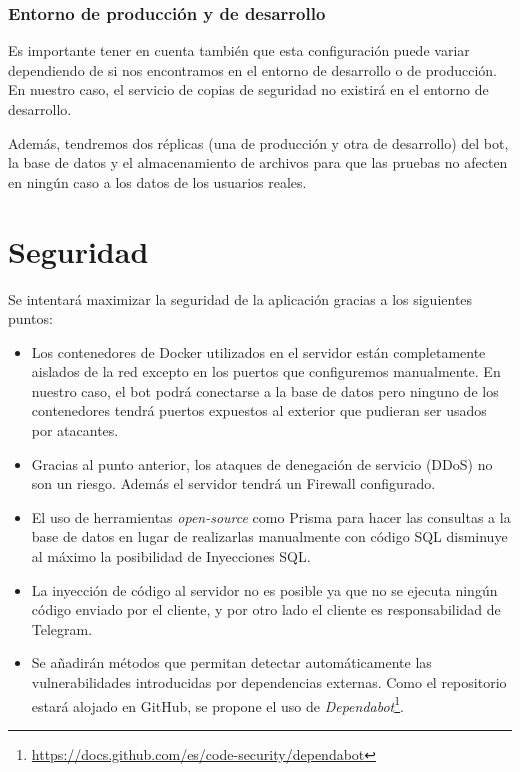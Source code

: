 \subsubsection{Entorno de producción y de desarrollo}

Es importante tener en cuenta también que esta configuración puede variar dependiendo de si nos encontramos en el entorno de desarrollo o de producción. En nuestro caso, el servicio de copias de seguridad no existirá en el entorno de desarrollo. 

Además, tendremos dos réplicas (una de producción y otra de desarrollo) del bot, la base de datos y el almacenamiento de archivos para que las pruebas no afecten en ningún caso a los datos de los usuarios reales.

\section{Seguridad}

Se intentará maximizar la seguridad de la aplicación gracias a los siguientes puntos:

\begin{itemize}
    \item Los contenedores de Docker utilizados en el servidor están completamente aislados de la red excepto en los puertos que configuremos manualmente. En nuestro caso, el bot podrá conectarse a la base de datos pero ninguno de los contenedores tendrá puertos expuestos al exterior que pudieran ser usados por atacantes.
    \item Gracias al punto anterior, los ataques de denegación de servicio (DDoS) no son un riesgo. Además el servidor tendrá un Firewall configurado.
    \item El uso de herramientas \textit{open-source} como Prisma para hacer las consultas a la base de datos en lugar de realizarlas manualmente con código SQL disminuye al máximo la posibilidad de Inyecciones SQL.
    \item La inyección de código al servidor no es posible ya que no se ejecuta ningún código enviado por el cliente, y por otro lado el cliente es responsabilidad de Telegram.
    \item Se añadirán métodos que permitan detectar automáticamente las vulnerabilidades introducidas por dependencias externas. Como el repositorio estará alojado en GitHub, se propone el uso de \textit{Dependabot}\footnote{\url{https://docs.github.com/es/code-security/dependabot}}.
\end{itemize}




